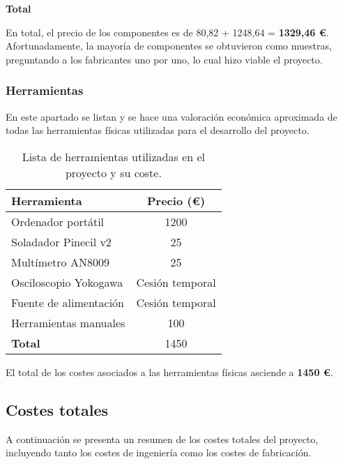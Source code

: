\textbf{Total}

En total, el precio de los componentes es de 80,82 + 1248,64 = \textbf{1329,46 \euro{}}. Afortunadamente, la mayoría de componentes se obtuvieron como muestras, preguntando a los fabricantes uno por uno, lo cual hizo viable el proyecto.

\subsubsection*{Herramientas}

En este apartado se listan y se hace una valoración económica aproximada de todas las herramientas físicas utilizadas para el desarrollo del proyecto.

\begin{table}[ht]
	\centering
	\begin{tabular}{|l|c|}
		\hline
		\textbf{Herramienta} & \textbf{Precio (\euro{})} \\
		\hline
		Ordenador portátil & 1200 \\
		Soladador Pinecil v2 & 25 \\
		Multímetro AN8009 & 25 \\
		Osciloscopio Yokogawa & Cesión temporal \\
		Fuente de alimentación & Cesión temporal \\
		Herramientas manuales & 100 \\
		\hline
		\textbf{Total} & 1450 \\
		\hline
	\end{tabular}
	\caption{Lista de herramientas utilizadas en el proyecto y su coste.}
\end{table}

El total de los costes asociados a las herramientas físicas asciende a \textbf{1450 \euro}.

\subsection*{Costes totales}

A continuación se presenta un resumen de los costes totales del proyecto, incluyendo tanto los costes de ingeniería como los costes de fabricación.

